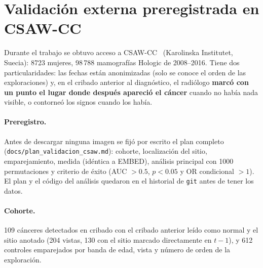 \section{Validación externa preregistrada en CSAW-CC}
\label{sec:resultados-csaw}
Durante el trabajo se obtuvo acceso a CSAW-CC~\cite{dataset_csawcc}
(Karolinska Institutet, Suecia): 8723 mujeres, 98\,788 mamografías Hologic de
2008--2016. Tiene dos particularidades: las fechas están anonimizadas (solo
se conoce el orden de las exploraciones) y, en el cribado anterior al
diagnóstico, el radiólogo \textbf{marcó con un punto el lugar donde después
apareció el cáncer} cuando no había nada visible, o contorneó los signos
cuando los había.

\paragraph{Preregistro.} Antes de descargar ninguna imagen se fijó por
escrito el plan completo (\texttt{docs/plan\_validacion\_csaw.md}): cohorte,
localización del sitio, emparejamiento, medida (idéntica a EMBED), análisis
principal con 1000 permutaciones y criterio de éxito (AUC $> 0.5$,
$p < 0.05$ y OR condicional $> 1$). El plan y el código del análisis quedaron
en el historial de \texttt{git} antes de tener los datos.

\paragraph{Cohorte.} 109 cánceres detectados en cribado con el cribado
anterior leído como normal y el sitio anotado (204 vistas, 130 con el sitio
marcado directamente en $t-1$), y 612 controles emparejados por banda de
edad, vista y número de orden de la exploración.

